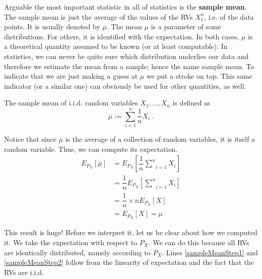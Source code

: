 Arguable the most important statistic in all of statistics is the \textbf{sample mean}. The sample mean is just the average of the
values of the RVs $ X_{1}^{n} $, i.e. of the data points. It is usually denoted by $ \overline{\mu} $. The mean $ \mu $ is a parameter of some
distributions. For others, it is identified with the expectation. In both cases, $ \mu $ is a theoretical quantity assumed to be known
(or at least computable). In statistics, we can never be quite sure which distribution underlies our data and therefore we estimate
the mean from a sample; hence the name sample mean. To indicate that we are just making a guess at $ \mu $ we put a stroke on top.
This same indicator (or a similar one) can obviously be used for other quantities, as well.

\begin{Definition}
The sample mean of i.i.d. random variables $ X_{1}, \ldots, X_{n} $ is defined as 
$$ \overline{\mu} := \underset{i=1}{\overset{n}{\sum}}\dfrac{1}{n} X_{i} \ . $$
\end{Definition}

Notice that since $ \overline{\mu} $ is the average of a collection of random variables, it is itself a random variable. Thus, we can
compute its expectation.
\begin{align}
E_{P_{X}}[\overline{\mu}] &= E_{P_{X}}\left[\dfrac{1}{n} \underset{i=1}{\overset{n}{\sum}} X_{i}\right] \\
&= \dfrac{1}{n} E_{P_{X}}\left[\underset{i=1}{\overset{n}{\sum}} X_{i}\right] \label{sampleMeanStep1} \\
&= \dfrac{1}{n} \times n E_{P_{X}}[X] \label{sampleMeanStep2} \\
&= E_{P_{X}}[X] = \mu
\end{align}

This result is huge! Before we interpret it, let us be clear about how we computed it. We take the expectation with respect to
$ P_{X} $. We can do this because all RVs are identically distributed, namely according to $ P_{X} $. Lines \ref{sampleMeanStep1} and
\ref{sampleMeanStep2} follow from the linearity of expectation and the fact that the RVs are i.i.d. 

